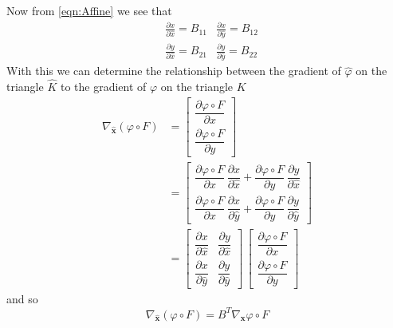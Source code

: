 Now from \eqref{eqn:Affine} we see that
\begin{align*}
  &\frac{\partial x}{\partial \hat{x}} = B_{11}   &\frac{\partial x}{\partial \hat{y}} = B_{12} \\
  &\frac{\partial y}{\partial \hat{x}} = B_{21}   &\frac{\partial y}{\partial \hat{y}} = B_{22}
\end{align*}
With this we can determine the relationship between the gradient of $\hat{\varphi}$ on the
triangle $\hat{K}$ to the gradient of $\varphi$ on the triangle $K$
\begin{align*}
  \nabla_{\mathbf{\hat{x}}}\left( \varphi \circ F \right) &= \begin{bmatrix}
    \dfrac{\partial \varphi\circ F}{\partial \hat{x}} \\[1em]
    \dfrac{\partial \varphi\circ F}{\partial \hat{y}}
  \end{bmatrix} \\
  &=\begin{bmatrix}
    \dfrac{\partial \varphi\circ F}{\partial x} \, \dfrac{\partial x}{\partial \hat{x}} +
      \dfrac{\partial \varphi\circ F}{\partial y} \, \dfrac{\partial y}{\partial \hat{x}} \\[1em]
    \dfrac{\partial \varphi\circ F}{\partial x} \, \dfrac{\partial x}{\partial \hat{y}} +
      \dfrac{\partial \varphi\circ F}{\partial y} \, \dfrac{\partial y}{\partial \hat{y}}
  \end{bmatrix} \\
  &= \begin{bmatrix}
    \dfrac{\partial x}{\partial \hat{x}} & \dfrac{\partial y}{\partial \hat{x}} \\[1em]
    \dfrac{\partial x}{\partial \hat{y}} & \dfrac{\partial y}{\partial \hat{y}}
  \end{bmatrix}\, \begin{bmatrix}
    \dfrac{\partial \varphi\circ F}{\partial x} \\[1em] \dfrac{\partial \varphi\circ F}{\partial y}
  \end{bmatrix}
\end{align*}
and so
\begin{equation}
  \nabla_{\mathbf{\hat{x}}}\left( \varphi \circ F \right) = B^T \nabla_{\mathbf{x}} \varphi \circ F
  \label{eqn:Gradient}
\end{equation}

